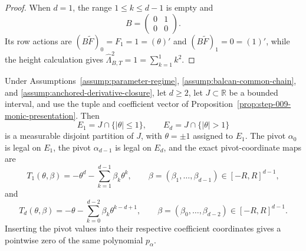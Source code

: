 \begin{proof}
When \(d=1\), the range \(1\leq k\leq d-1\) is empty and
\begin{equation}
\label{eq:appendix-display-265}
B=\begin{pmatrix}0&1\\0&0\end{pmatrix}.
\end{equation}
Its row actions are \((B\widetilde F)_0=F_1=1=(\theta)'\) and \((B\widetilde F)_1=0=(1)'\), while the height calculation gives \(\widehat\Lambda_{B,T}^2=1=\sum_{k=1}^{1}k^2\).
\end{proof}

\begin{proposition} \label{prop:step-009-two-pivot-charts}
Under Assumptions~\ref{assump:parameter-regime}, \ref{assump:balcan-common-chain}, and \ref{assump:anchored-derivative-closure}, let \(d\geq2\), let \(J\subset\mathbb R\) be a bounded interval, and use the tuple and coefficient vector of Proposition~\ref{prop:step-009-monic-presentation}. Then
\begin{equation}
\label{eq:appendix-display-266}
E_1=J\cap\{\lvert\theta\rvert\leq1\},
\qquad
E_d=J\cap\{\lvert\theta\rvert>1\}
\end{equation}
is a measurable disjoint partition of \(J\), with \(\theta=\pm1\) assigned to \(E_1\). The pivot \(\alpha_0\) is legal on \(E_1\), the pivot \(\alpha_{d-1}\) is legal on \(E_d\), and the exact pivot-coordinate maps are
\begin{equation}
\label{eq:appendix-display-267}
T_1(\theta,\beta)
=-\theta^d-\sum_{k=1}^{d-1}\beta_k\theta^k,
\qquad
\beta=(\beta_1,\ldots,\beta_{d-1})\in[-R,R]^{d-1},
\end{equation}
and
\begin{equation}
\label{eq:appendix-display-268}
T_d(\theta,\beta)
=-\theta-\sum_{k=0}^{d-2}\beta_k\theta^{k-d+1},
\qquad
\beta=(\beta_0,\ldots,\beta_{d-2})\in[-R,R]^{d-1}.
\end{equation}
Inserting the pivot values into their respective coefficient coordinates gives a pointwise zero of the same polynomial \(p_\alpha\).


\end{proposition}

